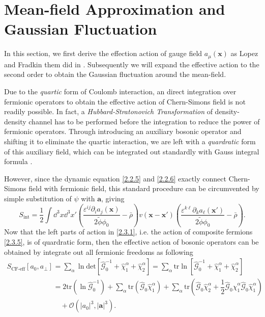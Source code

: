 \documentclass[bachelor,english,numbers]{ustcthesis}
\begin{document}
	\section{Mean-field Approximation and Gaussian Fluctuation}
		\indent\par In this section, we first derive the effection action of gauge field $a_\mu(\bm{x})$ as Lopez and Fradkin them did in \cite{lopez1991fractional}. Subsequently we will expand the effective action to the second order to obtain the Gaussian fluctuation around the mean-field.\par
		Due to the \emph{quartic} form of Coulomb interaction, an direct integration over fermionic operators to obtain the effective action of Chern-Simons field is not readily possible. In fact, a \emph{Hubbard-Stratonovich Transformation} of density-density channel has to be performed before the integration to reduce the power of fermionic operators. Through introducing an auxiliary bosonic operator and shifting it to eliminate the quartic interaction, we are left with a \emph{quardratic} form of this auxiliary field, which can be integrated out standardly with Gauss integral formula \cite{Stratonovich1957On,hubbard1959calculation,altland2010condensed}.\par
		However, since the dynamic equation \eqref{2.2.5} and \eqref{2.2.6} exactly connect Chern-Simons field with fermionic field, this standard procedure can be circumvented by simple substitution of $\psi$ with $\bm{a}$, giving
		\begin{equation}\label{2.4.1}
			S_{\text{int}}=\dfrac{1}{2}\int\dd^3 x\dd^3 x' \left(\dfrac{\varepsilon^{ij}\partial_i a_j(\bm{x})}{2\widetilde{\phi}\phi_0}-\bar{\rho}\right) v(\bm{x}-\bm{x'})\left(\dfrac{\varepsilon^{k\ell}\partial_k a_\ell(\bm{x'})}{2\widetilde{\phi}\phi_0}-\bar{\rho}\right).
		\end{equation}
		\indent Now that the left parts of action in \eqref{2.3.1}, i.e. the action of composite fermions \eqref{2.3.5}, is of quardratic form, then the effective action of bosonic operators can be obtained by integrate out all fermionic freedoms as following
		\begin{align}
			S_{\text{CF-eff}}[a_0,a_{\perp}]&=\sum_\alpha\ln\mathrm{det}\left[\hat{\mathcal{G}}_0^{-1}+\hat{\chi}^\alpha_1+\hat{\chi}^\alpha_2\right]=\sum_\alpha\mathrm{tr}\ln\left[\hat{\mathcal{G}}_0^{-1}+\hat{\chi}^\alpha_1+\hat{\chi}^\alpha_2\right]\nonumber\\
			&=2\mathrm{tr}\left(\ln\hat{\mathcal{G}}_0^{-1}\right)+\sum_\alpha\mathrm{tr}\left(\hat{\mathcal{G}}_0\hat{\chi}^\alpha_1\right)+\sum_\alpha\mathrm{tr}\left(\hat{\mathcal{G}}_0\hat{\chi}^\alpha_2+\dfrac{1}{2}\hat{\mathcal{G}}_0\hat{\chi}^\alpha_1\hat{\mathcal{G}}_0\hat{\chi}^\alpha_1\right)\nonumber\\
			&\quad+\mathcal{O}(|a_0|^3,|\bm{a}|^3).\label{2.4.2}
		\end{align}
\end{document}
